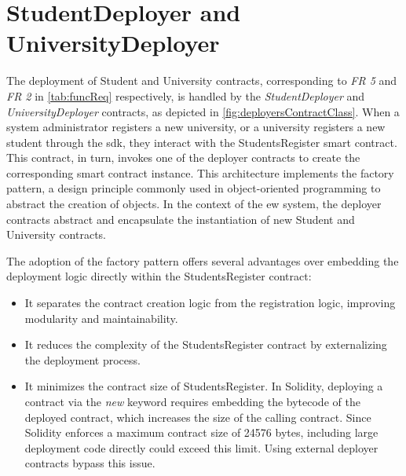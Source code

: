 \section{StudentDeployer and UniversityDeployer}
The deployment of Student and University contracts, corresponding to \textit{FR 5} and \textit{FR 2} in \cref{tab:funcReq} respectively, is handled by the \textit{StudentDeployer} and \textit{UniversityDeployer} contracts, as depicted in \cref{fig:deployersContractClass}. When a system administrator registers a new university, or a university registers a new student through the \acrshort{sdk}, they interact with the StudentsRegister smart contract. This contract, in turn, invokes one of the deployer contracts to create the corresponding smart contract instance. This architecture implements the factory pattern, a design principle commonly used in object-oriented programming to abstract the creation of objects. In the context of the \acrshort{ew} system, the deployer contracts abstract and encapsulate the instantiation of new Student and University contracts.

The adoption of the factory pattern offers several advantages over embedding the deployment logic directly within the StudentsRegister contract:
\begin{itemize}
    \item It separates the contract creation logic from the registration logic, improving modularity and maintainability.
    \item It reduces the complexity of the StudentsRegister contract by externalizing the deployment process.
    \item It minimizes the contract size of StudentsRegister. In Solidity, deploying a contract via the \textit{new} keyword requires embedding the bytecode of the deployed contract, which increases the size of the calling contract. Since Solidity enforces a maximum contract size of 24576 bytes, including large deployment code directly could exceed this limit. Using external deployer contracts bypass this issue.
\end{itemize}

